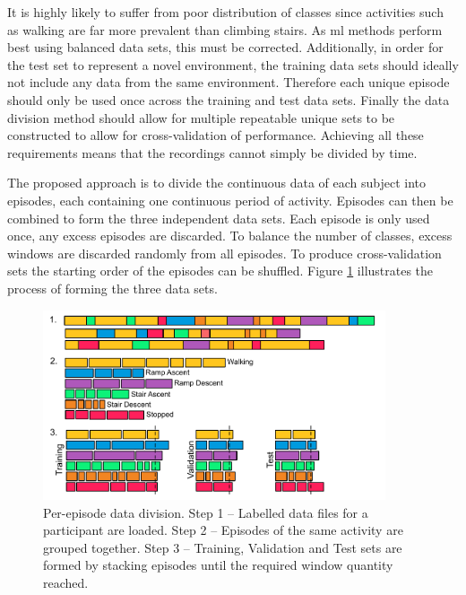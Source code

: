 It is highly likely to suffer from poor distribution of classes since activities such as walking are far more prevalent than climbing stairs. As \acrshort{ml} methods perform best using balanced data sets, this must be corrected. Additionally, in order for the test set to represent a novel environment, the training data sets should ideally not include any data from the same environment. Therefore each unique episode should only be used once across the training and test data sets. Finally the data division method should allow for multiple repeatable unique sets to be constructed to allow for cross-validation of performance. Achieving all these requirements means that the recordings cannot simply be divided by time.

The proposed approach is to divide the continuous data of each subject into episodes, each containing one continuous period of activity. Episodes can then be combined to form the three independent data sets. Each episode is only used once, any excess episodes are discarded. To balance the number of classes, excess windows are discarded randomly from all episodes. To produce cross-validation sets the starting order of the episodes can be shuffled. Figure \ref{fig:methods-per-episode-data-division} illustrates the process of forming the three data sets.

 \begin{figure}[hbt]
     \centering
     \includegraphics[width=0.9\textwidth]{content/3-Methods/Episode_Division.pdf}
     \caption[Per-episode data division]{Per-episode data division. Step 1 -- Labelled data files for a participant are loaded. Step 2 -- Episodes of the same activity are grouped together. Step 3 -- Training, Validation and Test sets are formed by stacking episodes until the required window quantity reached.}
     \label{fig:methods-per-episode-data-division}
 \end{figure}
 
